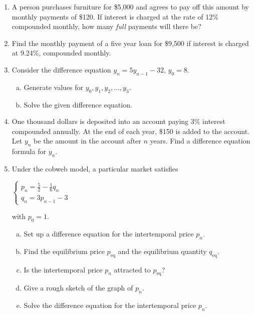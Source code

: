 \documentclass[11pt]{exam}
\begin{document}
\begin{enumerate}
\item A person purchases furniture for \$5,000 and agrees to pay off this amount by monthly payments of \$120.  If interest is charged at the rate of 12\% compounded monthly, how many \emph{full} payments will there be?

\item Find the monthly payment of a five year loan for \$9,500 if interest is charged at 9.24\%, compounded monthly.

\item Consider the difference equation $y_{n} = 5y_{n-1} - 32$, $y_{0} = 8$.
\begin{enumerate}[(a)]
\item Generate values for $y_{0}, y_{1}, y_{2}, \dots, y_{3}$.
\item Solve the given difference equation.
\end{enumerate}

\item One thousand dollars is deposited into an account paying 3\% interest compounded annually.  At the end of each year, \$150 is added to the account.  Let $y_{n} $ be the amount in the account after $n$ years.  Find a difference equation formula for $y_{n}$.

\item Under the cobweb model, a particular market satisfies 
\begin{center}
$\begin{cases}
p_n=\frac{5}{2}-\frac{1}{6}q_n\\
q_n=3p_{n-1}-3
\end{cases}$
\end{center}
with $p_0=1$.

\begin{enumerate}[(a)]
\item Set up a difference equation for the intertemporal price $p_n$.
\item Find the equilibrium price $p_{\text{eq}}$ and the equilibrium quantity $q_{\text{eq}}$.
\item Is the intertemporal price $p_n$ attracted to $p_{\text{eq}}$?
\item Give a rough sketch of the graph of $p_n$.
\item Solve the difference equation for the intertemporal price $p_n$.
\end{enumerate}
\newpage


\end{enumerate}
\end{document}

